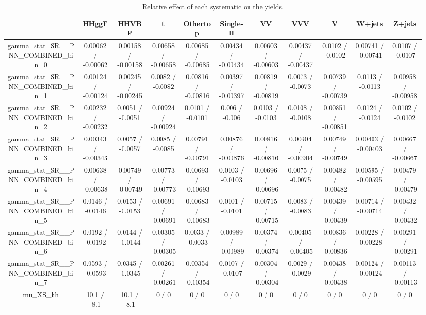 \documentclass[10pt]{article}
\begin{document}
\begin{table}[htbp]
\begin{center}
\begin{tabular}{|c|c|c|c|c|c|c|c|c|c|c|}
\hline 
      & HHggF      & HHVBF      & t      & Othertop      & Single-H      & VV      & VVV      & V      & W+jets      & Z+jets \\ 
\hline 
  gamma_stat_SR__PNN_COMBINED_bin_0 & 0.00062 / -0.00062 & 0.00158 / -0.00158 & 0.00658 / -0.00658 & 0.00685 / -0.00685 & 0.00434 / -0.00434 & 0.00603 / -0.00603 & 0.00437 / -0.00437 & 0.0102 / -0.0102 & 0.00741 / -0.00741 & 0.0107 / -0.0107 \\ 
  gamma_stat_SR__PNN_COMBINED_bin_1 & 0.00124 / -0.00124 & 0.00245 / -0.00245 & 0.0082 / -0.0082 & 0.00816 / -0.00816 & 0.00397 / -0.00397 & 0.00819 / -0.00819 & 0.0073 / -0.0073 & 0.00739 / -0.00739 & 0.0113 / -0.0113 & 0.00958 / -0.00958 \\ 
  gamma_stat_SR__PNN_COMBINED_bin_2 & 0.00232 / -0.00232 & 0.0051 / -0.0051 & 0.00924 / -0.00924 & 0.0101 / -0.0101 & 0.006 / -0.006 & 0.0103 / -0.0103 & 0.0108 / -0.0108 & 0.00851 / -0.00851 & 0.0124 / -0.0124 & 0.0102 / -0.0102 \\ 
  gamma_stat_SR__PNN_COMBINED_bin_3 & 0.00343 / -0.00343 & 0.0057 / -0.0057 & 0.0085 / -0.0085 & 0.00791 / -0.00791 & 0.00876 / -0.00876 & 0.00816 / -0.00816 & 0.00904 / -0.00904 & 0.00749 / -0.00749 & 0.00403 / -0.00403 & 0.00667 / -0.00667 \\ 
  gamma_stat_SR__PNN_COMBINED_bin_4 & 0.00638 / -0.00638 & 0.00749 / -0.00749 & 0.00773 / -0.00773 & 0.00693 / -0.00693 & 0.0103 / -0.0103 & 0.00696 / -0.00696 & 0.0075 / -0.0075 & 0.00482 / -0.00482 & 0.00595 / -0.00595 & 0.00479 / -0.00479 \\ 
  gamma_stat_SR__PNN_COMBINED_bin_5 & 0.0146 / -0.0146 & 0.0153 / -0.0153 & 0.00691 / -0.00691 & 0.00683 / -0.00683 & 0.0101 / -0.0101 & 0.00715 / -0.00715 & 0.0083 / -0.0083 & 0.00439 / -0.00439 & 0.00714 / -0.00714 & 0.00432 / -0.00432 \\ 
  gamma_stat_SR__PNN_COMBINED_bin_6 & 0.0192 / -0.0192 & 0.0144 / -0.0144 & 0.00305 / -0.00305 & 0.0033 / -0.0033 & 0.00989 / -0.00989 & 0.00374 / -0.00374 & 0.00405 / -0.00405 & 0.00836 / -0.00836 & 0.00228 / -0.00228 & 0.00291 / -0.00291 \\ 
  gamma_stat_SR__PNN_COMBINED_bin_7 & 0.0593 / -0.0593 & 0.0345 / -0.0345 & 0.00261 / -0.00261 & 0.00354 / -0.00354 & 0.0107 / -0.0107 & 0.00304 / -0.00304 & 0.0029 / -0.0029 & 0.00438 / -0.00438 & 0.00124 / -0.00124 & 0.00113 / -0.00113 \\ 
  mu_XS_hh & 10.1 / -8.1 & 10.1 / -8.1 & 0 / 0 & 0 / 0 & 0 / 0 & 0 / 0 & 0 / 0 & 0 / 0 & 0 / 0 & 0 / 0 \\ 
\hline 
\end{tabular} 
\caption{Relative effect of each systematic on the yields.} 
\end{center} 
\end{table} 
\end{document}

